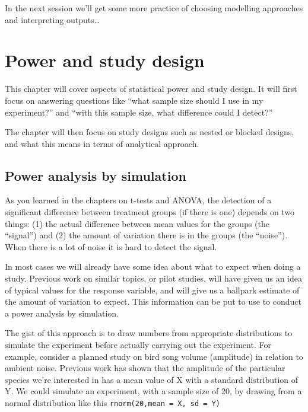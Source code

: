 \documentclass[
  a4paperpaper,
]{book}
\begin{document}
In the next session we'll get some more practice of choosing modelling approaches and interpreting outputs\ldots{}

\hypertarget{power-and-study-design}{%
\chapter{Power and study design}\label{power-and-study-design}}

This chapter will cover aspects of statistical power and study design. It will first focus on answering questions like ``what sample size should I use in my experiment?'' and ``with this sample size, what difference could I detect?''

The chapter will then focus on study designs such as nested or blocked designs, and what this means in terms of analytical approach.

\hypertarget{power-analysis-by-simulation}{%
\section{Power analysis by simulation}\label{power-analysis-by-simulation}}

As you learned in the chapters on t-tests and ANOVA, the detection of a significant difference between treatment groups (if there is one) depends on two things: (1) the actual difference between mean values for the groups (the ``signal'') and (2) the amount of variation there is in the groups (the ``noise''). When there is a lot of noise it is hard to detect the signal.

In most cases we will already have some idea about what to expect when doing a study. Previous work on similar topics, or pilot studies, will have given us an idea of typical values for the response variable, and will give us a ballpark estimate of the amount of variation to expect. This information can be put to use to conduct a power analysis by simulation.

The gist of this approach is to draw numbers from appropriate distributions to simulate the experiment before actually carrying out the experiment. For example, consider a planned study on bird song volume (amplitude) in relation to ambient noise. Previous work has shown that the amplitude of the particular species we're interested in has a mean value of X with a standard distribution of Y. We could simulate an experiment, with a sample size of 20, by drawing from a normal distribution like this \texttt{rnorm(20,mean\ =\ X,\ sd\ =\ Y)}
\end{document}
